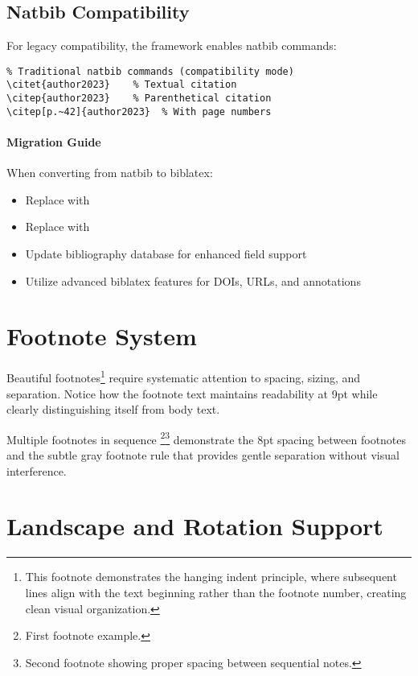\documentclass[11pt]{article}
\begin{document}
\subsection{Natbib Compatibility}

For legacy compatibility, the framework enables natbib commands:

\begin{verbatim}
% Traditional natbib commands (compatibility mode)
\citet{author2023}    % Textual citation
\citep{author2023}    % Parenthetical citation
\citep[p.~42]{author2023}  % With page numbers
\end{verbatim}

\paragraph{Migration Guide} When converting from natbib to biblatex:
\begin{itemize}
\item Replace  with 
\item Replace  with 
\item Update bibliography database for enhanced field support
\item Utilize advanced biblatex features for DOIs, URLs, and annotations
\end{itemize}

\section{Footnote System}

Beautiful footnotes\footnote{This footnote demonstrates the hanging indent principle, where subsequent lines align with the text beginning rather than the footnote number, creating clean visual organization.} require systematic attention to spacing, sizing, and separation. Notice how the footnote text maintains readability at 9pt while clearly distinguishing itself from body text.

Multiple footnotes in sequence \footnote{First footnote example.}\footnote{Second footnote showing proper spacing between sequential notes.} demonstrate the 8pt spacing between footnotes and the subtle gray footnote rule that provides gentle separation without visual interference.

\section{Landscape and Rotation Support}
\end{document}
